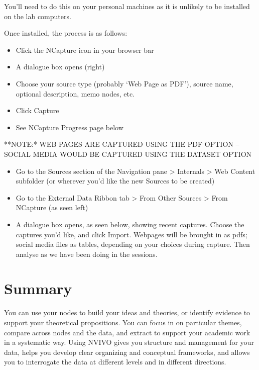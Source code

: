\documentclass[
]{book}
\providecommand{\tightlist}{%
  \setlength{\itemsep}{0pt}\setlength{\parskip}{0pt}}
\begin{document}
You'll need to do this on your personal machines as it is unlikely to be installed on the lab computers.

Once installed, the process is as follows:

\begin{itemize}
\tightlist
\item
  Click the NCapture icon in your browser bar
\item
  A dialogue box opens (right)
\item
  Choose your source type (probably `Web Page as PDF'), source name, optional description, memo nodes, etc.
\item
  Click Capture
\item
  See NCapture Progress page below
\end{itemize}

**NOTE:* WEB PAGES ARE CAPTURED USING THE PDF OPTION -- SOCIAL MEDIA WOULD BE CAPTURED USING THE DATASET OPTION

\begin{itemize}
\tightlist
\item
  Go to the Sources section of the Navigation pane \textgreater{} Internals \textgreater{} Web Content subfolder (or wherever you'd like the new Sources to be created)
\item
  Go to the External Data Ribbon tab \textgreater{} From Other Sources \textgreater{} From NCapture (as seen left)
\item
  A dialogue box opens, as seen below, showing recent captures. Choose the captures you'd like, and click Import. Webpages will be brought in as pdfs; social media files as tables, depending on your choices during capture.
  Then analyse as we have been doing in the sessions.
\end{itemize}

\hypertarget{summary-8}{%
\section{Summary}\label{summary-8}}

You can use your nodes to build your ideas and theories, or identify evidence to support your theoretical propositions. You can focus in on particular themes, compare across nodes and the data, and extract to support your academic work in a systematic way. Using NVIVO gives you structure and management for your data, helps you develop clear organizing and conceptual frameworks, and allows you to interrogate the data at different levels and in different directions.

  
\end{document}
